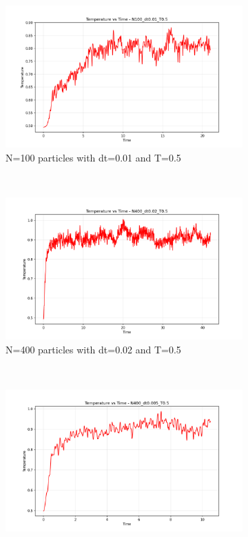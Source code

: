 \begin{figure}[H]
	\centering
	\begin{subfigure}{0.45\textwidth}
		\includegraphics[width=\textwidth]{media/temp_N100_dt0.01_T0.5.png}
		\caption{N=100 particles with dt=0.01 and T=0.5}
		\label{sfig:temp_N100}
	\end{subfigure}%
	~
	\begin{subfigure}{0.45\textwidth}
		\includegraphics[width=\textwidth]{media/temp_N400_dt0.02_T0.5.png}
		\caption{N=400 particles with dt=0.02 and T=0.5}
		\label{sfig:temp_N400_dt002}
	\end{subfigure}%
	\\
	\begin{subfigure}{0.45\textwidth}
		\includegraphics[width=\textwidth]{media/temp_N400_dt0.005_T0.5.png}

\end{subfigure}
\end{figure}
